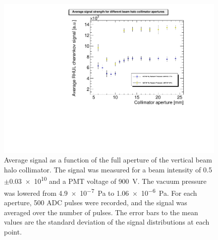 \begin{figure}
\centering
\includegraphics[width=\textwidth]{Figures/AverageSignal_perAperture_VacuumPressures.pdf}
\caption[RHUL Cherenkov detector signal vs. collimator aperture: different vacuum pressures]{Average signal as a function of the full aperture of the vertical beam halo collimator. The signal was measured for a beam intensity of \num{0.5}$\pm$\num{0.03e10} and a PMT voltage of \SI{900}{\volt}. The vacuum pressure was lowered from \SI{4.9e-7}{\pascal} to \SI{1.06e-6}{\pascal}. For each aperture, 500 ADC pulses were recorded, and the signal was averaged over the number of pulses. The error bars to the mean values are the standard deviation of the signal distributions at each point.}
\label{fig:AverageSignal_Aperture_VacuumPressures}
\end{figure}

